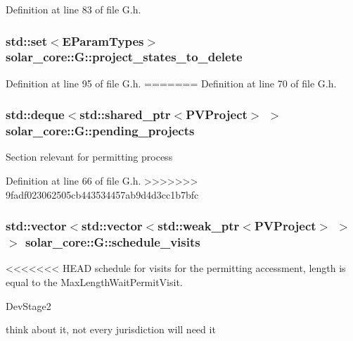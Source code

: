 Definition at line 83 of file G.\+h.

\hypertarget{classsolar__core_1_1_g_a26b220870264c1927d282dfe9412725e}{}
\subsubsection[{project\+\_\+states\+\_\+to\+\_\+delete}]{\setlength{\rightskip}{0pt plus 5cm}std\+::set$<${\bf E\+Param\+Types}$>$ solar\+\_\+core\+::\+G\+::project\+\_\+states\+\_\+to\+\_\+delete\hspace{0.3cm}{\ttfamily [protected]}}\label{classsolar__core_1_1_g_a26b220870264c1927d282dfe9412725e}


Definition at line 95 of file G.\+h.
=======
Definition at line 70 of file G.\+h.

\hypertarget{classsolar__core_1_1_g_a471a7f64e44432bd6d2f2974f507d669}{}
\subsubsection[{pending\+\_\+projects}]{\setlength{\rightskip}{0pt plus 5cm}std\+::deque$<$std\+::shared\+\_\+ptr$<${\bf P\+V\+Project}$>$ $>$ solar\+\_\+core\+::\+G\+::pending\+\_\+projects\hspace{0.3cm}{\ttfamily [protected]}}\label{classsolar__core_1_1_g_a471a7f64e44432bd6d2f2974f507d669}
Section relevant for permitting process 

Definition at line 66 of file G.\+h.
>>>>>>> 9fadf023062505cb443534457ab9d4d3cc1b7bfc

\hypertarget{classsolar__core_1_1_g_a33472d3b331a303ec8a9b61e2da163d3}{}
\subsubsection[{schedule\+\_\+visits}]{\setlength{\rightskip}{0pt plus 5cm}std\+::vector$<$std\+::vector$<$std\+::weak\+\_\+ptr$<${\bf P\+V\+Project}$>$ $>$ $>$ solar\+\_\+core\+::\+G\+::schedule\+\_\+visits\hspace{0.3cm}{\ttfamily [protected]}}\label{classsolar__core_1_1_g_a33472d3b331a303ec8a9b61e2da163d3}
<<<<<<< HEAD
schedule for visits for the permitting accessment, length is equal to the Max\+Length\+Wait\+Permit\+Visit.\begin{DoxyRefDesc}{Dev\+Stage2}
\item[\hyperlink{_dev_stage2__DevStage2000002}{Dev\+Stage2}]think about it, not every jurisdiction will need it \end{DoxyRefDesc}


